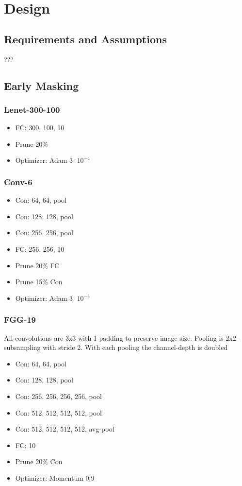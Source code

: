 \chapter{Design}
\label{ch:design}

\section{Requirements and Assumptions}
???

\section{Early Masking}

\subsection{Lenet-300-100}
\begin{itemize}
	\item FC: 300, 100, 10
	\item Prune 20\%
	\item Optimizer: Adam $3\cdot10^{-4}$
\end{itemize} 

\subsection{Conv-6}
\begin{itemize}
	\item Con: 64, 64, pool
	\item Con: 128, 128, pool
	\item Con: 256, 256, pool
	\item FC:  256, 256, 10
	\item Prune 20\% FC
	\item Prune 15\% Con
	\item Optimizer: Adam $3\cdot10^{-4}$
\end{itemize} 

\subsection{FGG-19}
All convolutions are 3x3 with 1 padding to preserve image-size. Pooling is 2x2-subsampling with stride 2. With each pooling the channel-depth is doubled 
\begin{itemize}
	\item Con: 64, 64, pool
	\item Con: 128, 128, pool
	\item Con: 256, 256, 256, 256, pool
	\item Con: 512, 512, 512, 512, pool
	\item Con: 512, 512, 512, 512, avg-pool
	\item FC:  10
	\item Prune 20\% Con
	\item Optimizer: Momentum $0.9$
\end{itemize} 

